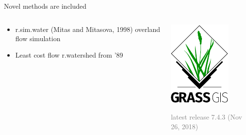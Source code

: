 \documentclass[xcolor={dvipsnames,usenames},beamer,aspectratio=169]{beamer}
\begin{document}
\begin{frame}{Novel methods are included}

\begin{columns}
\begin{column}{0.6\textwidth}

\begin{itemize}
  \item r.sim.water (Mitas and Mitasova, 1998) overland flow simulation
  \item Least cost flow r.watershed from ’89
\end{itemize}

\end{column}
\begin{column}{0.3\textwidth}

\begin{center}
  \includegraphics[width=\textwidth]{logos/grass_gis}
\end{center}

\vspace*{-1ex}

\textcolor{gray}{
\footnotesize
latest release 7.4.3
\scriptsize
(Nov 26, 2018)
}

\end{column}
\end{columns}

\end{frame}
\end{document}
